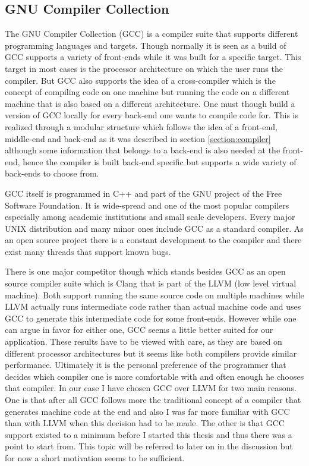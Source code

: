 \subsection{GNU Compiler Collection}
The GNU Compiler Collection (GCC) is a compiler suite that supports different programming languages and targets.
Though normally it is seen as a build of GCC supports a variety of front-ends while it was built for a specific target.
This target in most cases is the processor architecture on which the user runs the compiler.
But GCC also supports the idea of a cross-compiler which is the concept of compiling code on one machine but running the code on a different machine that is also based on a different architecture.
One must though build a version of GCC locally for every back-end one wants to compile code for.
This is realized through a modular structure which follows the idea of a front-end, middle-end and back-end as it was described in section \ref{section:compiler} although some information that belongs to a back-end is also needed at the front-end, hence the compiler is built back-end specific but supports a wide variety of back-ends to choose from.

GCC itself is programmed in C++ and part of the GNU project of the Free Software Foundation.
It is wide-spread and one of the most popular compilers especially among academic institutions and small scale developers.
Every major UNIX distribution and many minor ones include GCC as a standard compiler.\cite{definitveGCCGuide:introduction}
As an open source project there is a constant development to the compiler and there exist many threads that support known bugs.

There is one major competitor though which stands besides GCC as an open source compiler suite which is Clang that is part of the LLVM (low level virtual machine).
Both support running the same source code on multiple machines while LLVM actually runs intermediate code rather than actual machine code and uses GCC to generate this intermediate code for some front-ends.
However while one can argue in favor for either one, GCC seems a little better suited for our application. 
These results have to be viewed with care, as they are based on different processor architectures but it seems like both compilers provide similar performance.
Ultimately it is the personal preference of the programmer that decides which compiler one is more comfortable with and often enough he chooses that compiler.
In our case I have chosen GCC over LLVM for two main reasons.
One is that after all GCC follows more the traditional concept of a compiler that generates machine code at the end and also I was far more familiar with GCC than with LLVM when this decision had to be made.
The other is that GCC support existed to a minimum before I started this thesis and thus there was a point to start from.
This topic will be referred to later on in the discussion but for now a short motivation seems to be sufficient.

